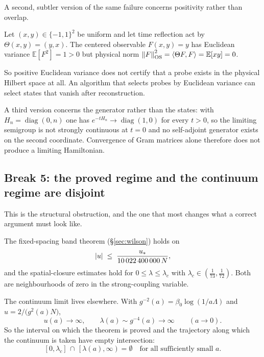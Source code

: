 A second, subtler version of the same failure concerns positivity rather
than overlap.

\begin{proposition}
\label{prop:break4b}
Let $(x,y) \in \{-1,1\}^2$ be uniform and let time reflection act by
$\Theta(x,y) = (y,x)$. The centered observable $F(x,y) = y$ has Euclidean
variance $\mathbb{E}[F^2] = 1 > 0$ but physical norm
$\left\lVert F \right\rVert_{\mathrm{OS}}^2 = \left\langle \Theta F, F \right\rangle = \mathbb{E}[xy] = 0$.
\end{proposition}

So positive Euclidean variance does not certify that a probe exists in
the physical Hilbert space at all. An algorithm that selects probes by
Euclidean variance can select states that vanish after reconstruction.

A third version concerns the generator rather than the states: with
$H_n = \operatorname{diag}(0,n)$ one has
$e^{-tH_n} \to \operatorname{diag}(1,0)$ for every $t>0$, so the limiting
semigroup is not strongly continuous at $t=0$ and no self-adjoint
generator exists on the second coordinate. Convergence of Gram matrices
alone therefore does not produce a limiting Hamiltonian.

\subsection{Break 5: the proved regime and the continuum regime are disjoint}
\label{sec:break5}

This is the structural obstruction, and the one that most changes what a
correct argument must look like.

The fixed-spacing band theorem (\S\ref{sec:wilson}) holds on
\begin{equation}
  \left\lvert u \right\rvert \;\le\; \frac{u_*}{10\,022\,400\,000\,N},
  \label{eq:break5-u}
\end{equation}
and the spatial-closure estimates hold for
$0 \le \lambda \le \lambda_c$ with
$\lambda_c \in \left(\tfrac{1}{73}, \tfrac{1}{72}\right)$. Both are
neighbourhoods of zero in the strong-coupling variable.

The continuum limit lives elsewhere. With
$g^{-2}(a) = \beta_0 \log(1/a\Lambda)$ and $u = 2/\big(g^2(a)N\big)$,
\begin{equation}
  u(a) \longrightarrow \infty,
  \qquad
  \lambda(a) \sim g^{-4}(a) \longrightarrow \infty
  \qquad (a \to 0).
\end{equation}
So the interval on which the theorem is proved and the trajectory along
which the continuum is taken have empty intersection:
\begin{equation}
  \left[0, \lambda_c\right] \,\cap\, \left[\lambda(a), \infty\right) = \emptyset
  \quad\text{for all sufficiently small } a .
\end{equation}

